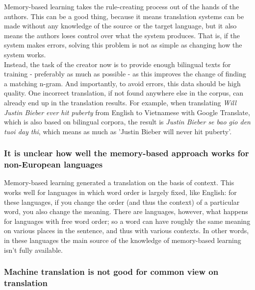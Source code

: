 \documentclass[12pt]{article}
\begin{document}
Memory-based learning takes the rule-creating process out of the hands of the authors. This can be a good thing, because it means translation systems can be made without any knowledge of the source or the target language, but it also means the authors loses control over what the system produces. That is, if the system makes errors, solving this problem is not as simple as changing how the system works. \\\indent
Instead, the task of the creator now is to provide enough bilingual texts for training - preferably as much as possible - as this improves the change of finding a matching n-gram. And importantly, to avoid errors, this data should be high quality. One incorrect translation, if not found anywhere else in the corpus, can already end up in the translation results. For example, when translating \emph{Will Justin Bieber ever hit puberty} from English to Vietnamese with Google Translate, which is also based on bilingual corpora, the result is \emph{Justin Bieber se bao gio den tuoi day thi}, which means as much as 'Justin Bieber will never hit puberty'.

\subsubsection{It is unclear how well the memory-based approach works for non-European languages}

Memory-based learning generated a translation on the basis of context. This works well for languages in which word order is largely fixed, like English: for these languages, if you change the order (and thus the context) of a particular word, you also change the meaning. There are languages, however, what happens for languages with free word order; so a word can have roughly the same meaning on various places in the sentence, and thus with various contexts. In other words, in these languages the main source of the knowledge of memory-based learning isn't fully available.


\subsubsection{Machine translation is not good for common view on translation}
\end{document}
